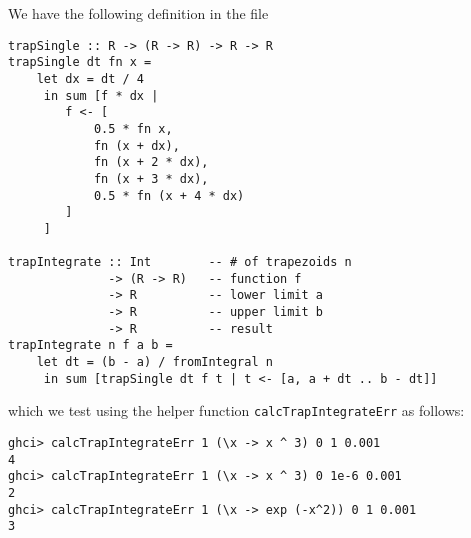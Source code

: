 
We have the following definition in the file 
\scriptsize\begin{verbatim}
trapSingle :: R -> (R -> R) -> R -> R
trapSingle dt fn x =
    let dx = dt / 4
     in sum [f * dx | 
        f <- [
            0.5 * fn x, 
            fn (x + dx), 
            fn (x + 2 * dx), 
            fn (x + 3 * dx), 
            0.5 * fn (x + 4 * dx)
        ]
     ]

trapIntegrate :: Int        -- # of trapezoids n
              -> (R -> R)   -- function f
              -> R          -- lower limit a
              -> R          -- upper limit b
              -> R          -- result
trapIntegrate n f a b =
    let dt = (b - a) / fromIntegral n
     in sum [trapSingle dt f t | t <- [a, a + dt .. b - dt]]
\end{verbatim}\normalsize
which we test using the helper function \verb|calcTrapIntegrateErr| as follows:
\scriptsize\begin{verbatim}
ghci> calcTrapIntegrateErr 1 (\x -> x ^ 3) 0 1 0.001
4
ghci> calcTrapIntegrateErr 1 (\x -> x ^ 3) 0 1e-6 0.001
2
ghci> calcTrapIntegrateErr 1 (\x -> exp (-x^2)) 0 1 0.001
3
\end{verbatim}\normalsize

